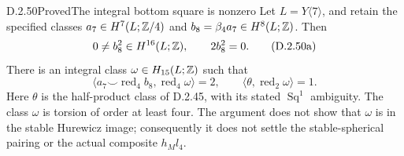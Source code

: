 \begin{claim}{D.2.50}{Proved}{The integral bottom square is nonzero}
Let $L=Y\langle7\rangle$, and retain the specified classes
$a_7\in H^7(L;\mathbb Z/4)$ and $b_8=\beta_4a_7\in H^8(L;\mathbb Z)$.
Then
\[
              0\ne b_8^2\in H^{16}(L;\mathbb Z),
              \qquad 2b_8^2=0.
              \tag{D.2.50a}
\]
There is an integral class $\omega\in H_{15}(L;\mathbb Z)$ such that
\[
 \big\langle a_7\smile\operatorname{red}_4b_8,
                     \operatorname{red}_4\omega\big\rangle=2,
 \qquad
 \big\langle\theta,\operatorname{red}_2\omega\big\rangle=1.
 \tag{D.2.50b}
\]
Here $\theta$ is the half-product class of D.2.45, with its
stated $\operatorname{Sq}^1$ ambiguity. The class $\omega$ is
torsion of order at least four. The argument does not show that
$\omega$ is in the stable Hurewicz image; consequently it does
not settle the stable-spherical pairing or the actual composite
$h_Ml_4$.
\end{claim}
